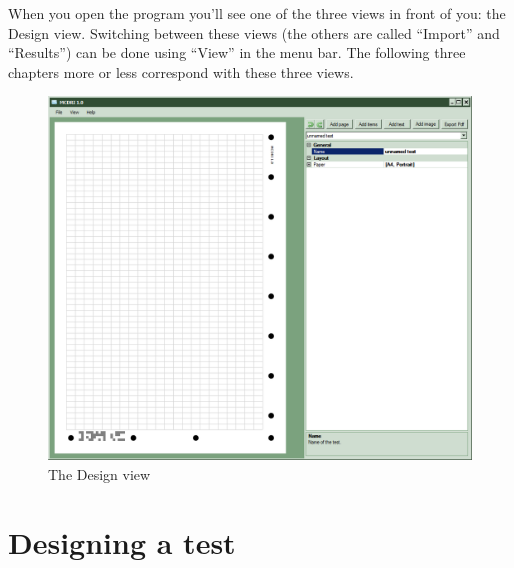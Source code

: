 \documentclass[10pt,a4paper]{article}
\begin{document}
When you open the program you'll see one of the three views in front of you: the Design view. Switching between these views (the others are called ``Import'' and ``Results'') can be done using ``View'' in the menu bar. The following three chapters more or less correspond with these three views.

\begin{figure}
\centering
\includegraphics[scale=.55]{img/design.png}
\caption{The Design view}
\end{figure}

\section{Designing a test}
\end{document}
